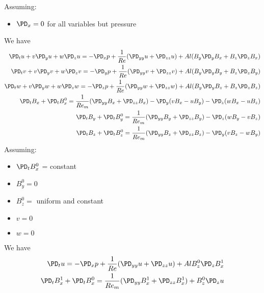 \documentclass[11pt]{article}
\begin{document}
\normalsize
Assuming:
\begin{itemize}\setlength\itemsep{-1em}
	\item $\PD_x=0$ for all variables but pressure
\end{itemize}
We have
\begin{equation}\begin{aligned}
\PD_t u+ v\PD_y u + w\PD_z u = -\PD_x p+ \frac{1}{Re} (\PD_{yy} u+\PD_{zz} u) + Al (B_y \PD_y B_x + B_z \PD_z B_x) \\
\PD_t v+ v\PD_y v + w\PD_z v = -\PD_y p+ \frac{1}{Re} (\PD_{yy} v+\PD_{zz} v) + Al (B_y \PD_y B_y + B_z \PD_z B_y) \\
\PD_t w+ v\PD_y w + w\PD_z w = -\PD_z p+ \frac{1}{Re} (\PD_{yy} w+\PD_{zz} w) + Al (B_y \PD_y B_z + B_z \PD_z B_z) \\
\PD_t B_x + \PD_t B_x^0 = \frac{1}{Re_m} (\PD_{yy} B_x+\PD_{zz} B_x) - \PD_y (v B_x - u B_y) - \PD_z (w B_x - u B_z) \\
\PD_t B_y + \PD_t B_y^0 = \frac{1}{Re_m} (\PD_{yy} B_y+\PD_{zz} B_y)                         - \PD_z (w B_y - v B_z) \\
\PD_t B_z + \PD_t B_z^0 = \frac{1}{Re_m} (\PD_{yy} B_z+\PD_{zz} B_z) - \PD_y (v B_z - w B_y)                         \\
\end{aligned} \end{equation}
Assuming:
\begin{itemize}\setlength\itemsep{-1em}
	\item $\PD_t B_x^0$ = constant
	\item $B_y^0 = 0$
	\item $B_z^0 = $ uniform and constant
	\item $v = 0$
	\item $w = 0$
\end{itemize}
We have
\begin{equation}\begin{aligned}
\PD_t u = -\PD_x p + \frac{1}{Re} (\PD_{yy} u+\PD_{zz} u) + Al B_z^0 \PD_z B_x^1 \\
\PD_t B_x^1 + \PD_t B_x^0 = \frac{1}{Re_m} (\PD_{yy} B_x^1+\PD_{zz} B_x^1) + B_z^0 \PD_z u \\
\end{aligned} \end{equation}
\end{document}
